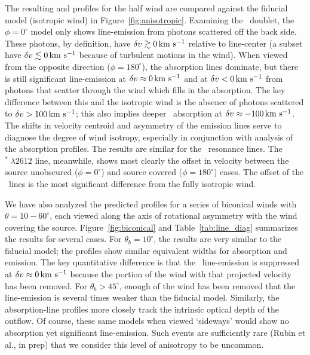 \documentclass[12pt,preprint]{aastex}
\begin{document}
The resulting  and
 profiles for the half wind are compared against the fiducial model
(isotropic wind) in Figure~\ref{fig:anisotropic}.  
Examining the \mgiid\ doublet, 
the $\phi = 0^\circ$ model only shows
line-emission from photons scattered
off the back side.  These photons, by definition, have $\delta v \gtrsim 0 \, {\rm km~s^{-1}}$
relative to line-center (a subset have $\delta v \lesssim 0 \, {\rm km~s^{-1}}$ because
of turbulent motions in the wind). 
When viewed from the opposite direction ($\phi = 180^\circ$), the
absorption lines dominate, but there is still significant
line-emission at $\delta v \approx 0 \, {\rm km~s^{-1}}$ and at $\delta v < 0 \, {\rm km~s^{-1}}$ 
from photons that scatter through the wind
which fills in the absorption. 
The key difference between this and the isotropic wind is the absence of photons
scattered to $\delta v > 100 \, {\rm km~s^{-1}}$;  this also implies deeper 
\mgiib\ absorption at $\delta v \approx -100 \, {\rm km~s^{-1}}$. The 
shifts in velocity centroid and asymmetry of the emission lines
serve to diagnose the degree of wind isotropy, especially in
conjunction with analysis of the absorption profiles. 
The results are similar for the \feiid\ resonance lines.  The
$^* \; \lambda 2612$ line, meanwhile, shows most clearly the
offset in velocity between the source unobscured ($\phi = 0^\circ$)
and source covered ($\phi = 180^\circ$) cases.  The offset of the
\feiis\ lines is the most significant 
difference from the fully isotropic wind.

We have also analyzed the predicted profiles for a series of biconical
winds with $\theta = 10-60^\circ$, each viewed along the axis of
rotational asymmetry with the wind covering the
source. Figure~\ref{fig:biconical} and
Table~\ref{tab:line_diag} summarizes the results for several cases.  For
$\theta_b = 10^\circ$, the results are
very similar to the fiducial model;  the profiles show
similar equivalent widths for absorption and emission.  The key
quantitative difference is that the \feiis\ line-emission is
suppressed at $\delta v \approx 0 \, {\rm km~s^{-1}}$ because the portion of the
wind with that projected velocity has been removed.  For
$\theta_b>45^\circ$, enough of the wind has been removed that the
line-emission is several times weaker than the fiducial model.
Similarly, the absorption-line profiles more closely track the
intrinsic optical depth of the outflow.   Of course, these same models
when viewed `sideways' would show no absorption yet significant
line-emission.  Such events are sufficiently rare (Rubin et
al., in prep) that we consider this level of anisotropy to be
uncommon.
\end{document}
